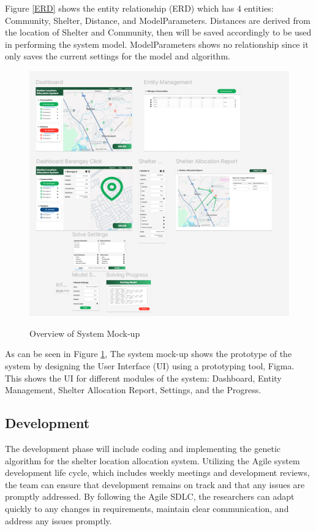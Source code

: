 	Figure \ref{ERD} shows the entity relationship (ERD) which has 4 entities: Community, Shelter, Distance, and ModelParameters. Distances are derived from the location of Shelter and Community, then will be saved accordingly to be used in performing the system model. ModelParameters shows no relationship since it only saves the current settings for the model and algorithm.
	
	\begin{figure}[h!]
		\caption{Overview of System Mock-up}
		\centering
		\includegraphics[width=\textwidth]{SYSTEM MOCKUP}
		\label{Mockup}
	\end{figure}
	
	As can be seen in Figure \ref{Mockup}, The system mock-up shows the prototype of the system by designing the User Interface (UI) using a prototyping tool, Figma. This shows the UI for different modules of the system: Dashboard, Entity Management, Shelter Allocation Report, Settings, and the Progress.

\subsection{Development}
	The development phase will include coding and implementing the genetic algorithm for the shelter location allocation system. Utilizing the Agile system development life cycle, which includes weekly meetings and development reviews, the team can ensure that development remains on track and that any issues are promptly addressed. By following the Agile SDLC, the researchers can adapt quickly to any changes in requirements, maintain clear communication, and address any issues promptly.
	
